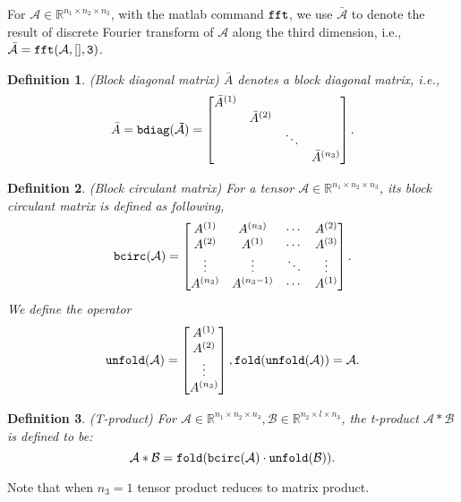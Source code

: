 \documentclass[journal,transmag]{IEEEtran}
\newtheorem{definition}{Definition}[section]
\theoremstyle{plain}
\begin{document}
For $\mathcal{A}\in\mathbb{R}^{n_1\times n_2 \times n_3}$, with the matlab command $\tt{fft}$, we use $\bar{\mathcal{A}}$ to denote the result of discrete Fourier transform of $\mathcal{A}$ along the third dimension, i.e., $\bar{\mathcal{A}}=\tt{fft}(\mathcal{A},[],3)$.
\\
\begin{definition}
(Block diagonal matrix) $\bar{A}$ denotes a block diagonal matrix, i.e.,
\[ \bar{A}=\tt{bdiag}(\bar{\mathcal{A}})=
\begin{bmatrix}
\bar{A}^{(1)} & & & \\
& \bar{A}^{(2)} & &\\
& & \ddots & \\
& & & \bar{A}^{(n_3)} \\
\end{bmatrix}.
\]
\end{definition}

\begin{definition}
(Block circulant matrix)
For a tensor $\mathcal{A}\in \mathbb{R}^{n_1\times n_2 \times n_3}$, its block circulant matrix is defined as following,
\[\tt{bcirc}(\mathcal{A})=
\begin{bmatrix}
A^{(1)} & A^{(n_3)} & \cdots & A^{(2)} \\
A^{(2)} & A^{(1)} & \cdots & A^{(3)} \\
\vdots & \vdots & \ddots & \vdots \\
A^{(n_3)} & A^{(n_3-1)} & \cdots & A^{(1)} \\
\end{bmatrix}.
\]
We define the operator
\[
\tt{unfold}(\mathcal{A})=
\begin{bmatrix}
A^{(1)} \\
A^{(2)} \\
\vdots \\
A^{(n_3)} \\
\end{bmatrix},
\tt{fold}(\tt{unfold}(\mathcal{A}))=\mathcal{A}.
\]
\end{definition}

\begin{definition} (T-product)
For $\mathcal{A}\in \mathbb{R}^{n_1 \times n_2 \times n_3},\mathcal{B}\in \mathbb{R}^{n_2\times l \times n_3}$, the t-product $\mathcal{A}*\mathcal{B}$ is defined to be:
\begin{equation}
\mathcal{A}*\mathcal{B}=\tt{fold}(\tt{bcirc(\mathcal{A})\cdot \tt{unfold}(\mathcal{B})}).
\end{equation}
\end{definition}
Note that when $n_3=1$ tensor product reduces to matrix product.
\end{document}
